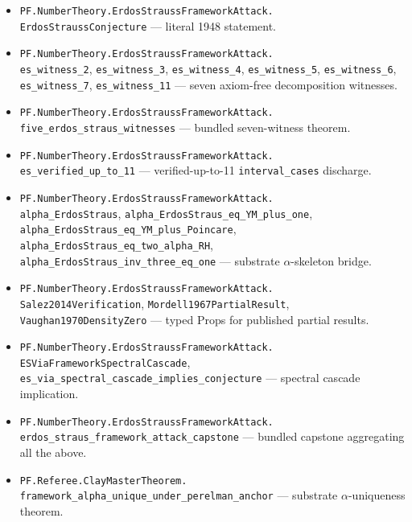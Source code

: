 \documentclass[11pt,a4paper]{article}
\theoremstyle{plain}
\theoremstyle{definition}
\begin{document}
\begin{itemize}[leftmargin=*,nosep]
\item \texttt{PF.NumberTheory.ErdosStraussFrameworkAttack.\\
  ErdosStraussConjecture} --- literal 1948 statement.
\item \texttt{PF.NumberTheory.ErdosStraussFrameworkAttack.\\
  es\_witness\_2},
  \texttt{es\_witness\_3},
  \texttt{es\_witness\_4},
  \texttt{es\_witness\_5},
  \texttt{es\_witness\_6},
  \texttt{es\_witness\_7},
  \texttt{es\_witness\_11}
  --- seven axiom-free decomposition witnesses.
\item \texttt{PF.NumberTheory.ErdosStraussFrameworkAttack.\\
  five\_erdos\_straus\_witnesses}
  --- bundled seven-witness theorem.
\item \texttt{PF.NumberTheory.ErdosStraussFrameworkAttack.\\
  es\_verified\_up\_to\_11}
  --- verified-up-to-11 \texttt{interval\_cases} discharge.
\item \texttt{PF.NumberTheory.ErdosStraussFrameworkAttack.\\
  alpha\_ErdosStraus},
  \texttt{alpha\_ErdosStraus\_eq\_YM\_plus\_one},
  \texttt{alpha\_ErdosStraus\_eq\_YM\_plus\_Poincare},
  \texttt{alpha\_ErdosStraus\_eq\_two\_alpha\_RH},
  \texttt{alpha\_ErdosStraus\_inv\_three\_eq\_one}
  --- substrate $\alpha$-skeleton bridge.
\item \texttt{PF.NumberTheory.ErdosStraussFrameworkAttack.\\
  Salez2014Verification},
  \texttt{Mordell1967PartialResult},
  \texttt{Vaughan1970DensityZero}
  --- typed Props for published partial results.
\item \texttt{PF.NumberTheory.ErdosStraussFrameworkAttack.\\
  ESViaFrameworkSpectralCascade},
  \texttt{es\_via\_spectral\_cascade\_implies\_conjecture}
  --- spectral cascade implication.
\item \texttt{PF.NumberTheory.ErdosStraussFrameworkAttack.\\
  erdos\_straus\_framework\_attack\_capstone}
  --- bundled capstone aggregating all the above.
\item \texttt{PF.Referee.ClayMasterTheorem.\\
  framework\_alpha\_unique\_under\_perelman\_anchor}
  --- substrate $\alpha$-uniqueness theorem.
\end{itemize}
\end{document}
